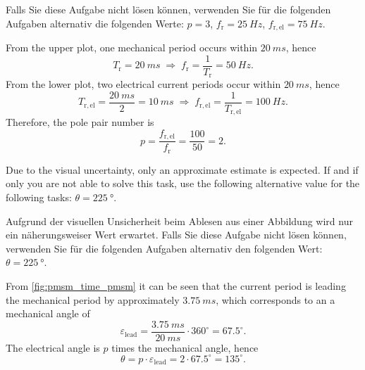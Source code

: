 
\begin{germanhintblock}
	Falls Sie diese Aufgabe nicht lösen können, verwenden Sie für die folgenden Aufgaben alternativ die folgenden Werte: $p=3$, $f_{\mathrm{r}}=\SI{25}{Hz}$, $f_{\mathrm{r,el}}=\SI{75}{Hz}$.
\end{germanhintblock}

\begin{solutionblock}
	From the upper plot, one mechanical period occurs within $\SI{20}{ms}$, hence
	$$T_{\mathrm{r}} = \SI{20}{ms}\;\Rightarrow\; f_{\mathrm{r}} = \frac{1}{T_{\mathrm{r}}}=\SI{50}{Hz}.$$
	From the lower plot, two electrical current periods occur within $\SI{20}{ms}$, hence
	$$T_{\mathrm{r,el}} = \frac{\SI{20}{ms}}{2} = \SI{10}{ms}\;\Rightarrow\; f_{\mathrm{r,el}} = \frac{1}{T_{\mathrm{r,el}}}=\SI{100}{Hz}.$$
	Therefore, the pole pair number is
	$$p = \frac{f_{\mathrm{r,el}}}{f_{\mathrm{r}}}=\frac{100}{50}=2.$$
\end{solutionblock}

\begin{hintblock}
	Due to the visual uncertainty, only an approximate estimate is expected. If and if only you are not able to solve this task, use the following alternative value for the following tasks: $\theta=\SI{225}{\degree}$.
\end{hintblock}


\begin{germanhintblock}
	Aufgrund der visuellen Unsicherheit beim Ablesen aus einer Abbildung wird nur ein näh\-er\-ungs\-wei\-ser Wert erwartet. Falls Sie diese Aufgabe nicht lösen können, verwenden Sie für die folgenden Aufgaben alternativ den folgenden Wert: $\theta=\SI{225}{\degree}$.
\end{germanhintblock}

\begin{solutionblock}
	From \autoref{fig:pmsm_time_pmsm} it can be seen that the current period is leading the mechanical period by approximately $\SI{3.75}{ms}$, which corresponds to an a mechanical angle of
	$$\varepsilon_{\mathrm{lead}} = \frac{\SI{3.75}{ms}}{\SI{20}{ms}}\cdot 360^\circ = 67.5^\circ.$$
	The electrical angle is $p$ times the mechanical angle, hence
	$$\theta = p \cdot \varepsilon_{\mathrm{lead}} = 2 \cdot 67.5^\circ = 135^\circ.$$
\end{solutionblock}


